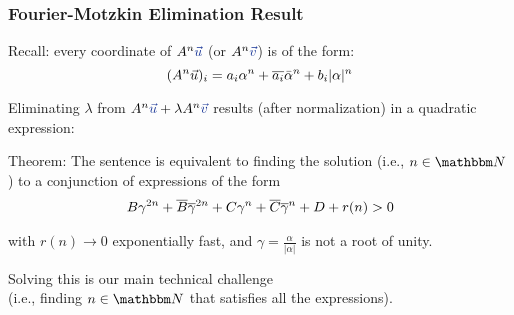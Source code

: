  \begin{frame}
 \frametitle{Fourier-Motzkin Elimination Result}
	Recall: every coordinate of $A^n \colInit{\vec{u}}$ (or $A^n\colInit{\vec{v}}$) is of the form:
	\vspace*{-8pt}
	$$(A^n\vec{u})_i=a_i \alpha^n+{\overline{a_i}} \bar{\alpha}^n+b_i |\alpha|^n$$
	\vspace*{-15pt}

	Eliminating $\lambda$ from $A^n\colInit{\vec{u}}+\lambda A^n\colInit{\vec{v}}$ results (after normalization) in a quadratic expression:
	\onslide<3->
	
	\begin{beamerboxesrounded}[upper=uppercolblue,lower=lowercolblue,shadow=true]{Theorem:}
	The sentence is equivalent to finding the solution (i.e., $n\in\NN$) to a conjunction of expressions of the form
	\vspace*{-8pt}
	\begin{align*}
		& B \gamma^{2n}+ {\overline{B}}{\overline{\gamma}}^{2n}+C\gamma^n+{\overline{C}}{\overline{\gamma}}^n+D+r(n)>0 \\
	\end{align*}
	
	\vspace*{-25pt}
	with $r(n)\to 0$ exponentially fast, and $\gamma=\frac{\alpha}{|\alpha|}$ is not a root of unity.
 	\end{beamerboxesrounded}
 	
 	  	Solving this is our main technical challenge \\
 	  	(i.e., finding $n\in \NN$ that satisfies all the expressions).
 \end{frame}

%	



